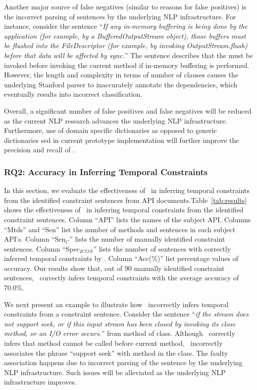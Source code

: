 Another major source of false negatives (similar to reasons for false positives) is the incorrect parsing of sentences by the underlying NLP infrastructure.
For instance, consider the sentence ``\textit{If any in-memory buffering is being done by the application (for example, by a BufferedOutputStream object),
those buffers must be flushed into the FileDescriptor (for example, by invoking OutputStream.flush) before that data will be affected by sync.}''
The sentence describes that the  must be invoked before invoking the current method if in-memory buffering is performed.
However, the length and complexity in terms of number of clauses causes the underlying Stanford parser to inaccurately annotate the dependencies,
which eventually results into incorrect classification. 

Overall, a significant number of false positives and false negatives will be reduced as the current NLP research advances the underlying NLP infrastructure.
Furthermore, use of domain specific dictionaries as opposed to generic dictionaries
sed in current prototype implementation will further improve the precision and recall of \tool. 

\subsubsection{RQ2: Accuracy in Inferring Temporal Constraints}

In this section, we evaluate the effectiveness of \tool\ in inferring temporal constraints from the identified constraint sentences from API documents.Table~\ref{tab:results} shows the effectiveness of \tool\ in inferring temporal constraints from the identified constraint sentences.
Column ``API'' lists the names of the subject API. 
Columns ``Mtds'' and ``Sen'' list the number of methods and sentences in each subject API's.
Column ``Sen$_C$'' lists the number of manually identified constraint sentences.
Column ``Spec$_{ICON}$'' lists the number of sentences with correctly inferred temporal constraints by \tool. 
Column ``Acc(\%)'' list percentage values of accuracy. 
Our results show that, out of 90 manually identified constraint sentences, \tool\ correctly infers temporal constraints with the average accuracy of 70.0\%.

We next present an example to illustrate how \tool\ incorrectly infers temporal constraints from a constraint sentence. Consider the sentence ``\textit{if the stream does not support seek, or if this input stream has been closed by invoking its close method, or an I/O error occurs.}'' from  method of  class. Although \tool\ correctly infers that method  cannot be called before current method, \tool\ incorrectly associates the phrase ``support seek'' with method  in the class. The faulty association happens due to incorrect parsing of the sentence by the underlying NLP infrastructure. Such issues will be alleviated as the underlying NLP infrastructure improves.   

